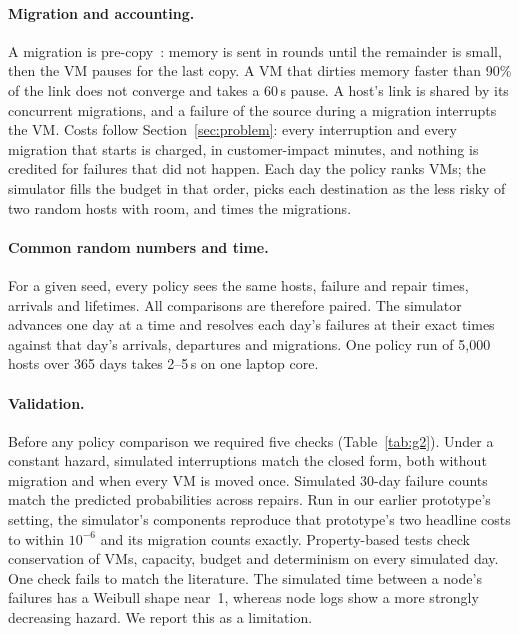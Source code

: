 \paragraph{Migration and accounting.}
A migration is pre-copy~\cite{clark2005live}: memory is sent in rounds until the remainder is
small, then the VM pauses for the last copy. A VM that dirties memory faster than 90\% of the
link does not converge and takes a 60\,s pause. A host's link is shared by its concurrent
migrations, and a failure of the source during a migration interrupts the VM. Costs follow
Section~\ref{sec:problem}: every interruption and every migration that starts is charged, in
customer-impact minutes, and nothing is credited for failures that did not happen. Each day the
policy ranks VMs; the simulator fills the budget in that order, picks each destination as the
less risky of two random hosts with room, and times the migrations.

\paragraph{Common random numbers and time.}
For a given seed, every policy sees the same hosts, failure and repair times, arrivals and
lifetimes. All comparisons are therefore paired. The simulator advances one day at a time and
resolves each day's failures at their exact times against that day's arrivals, departures and
migrations. One policy run of 5{,}000 hosts over 365 days takes 2--5\,s on one laptop core.

\paragraph{Validation.}
Before any policy comparison we required five checks (Table~\ref{tab:g2}). Under a constant
hazard, simulated interruptions match the closed form, both without migration and when every VM
is moved once. Simulated 30-day failure counts match the predicted probabilities across repairs.
Run in our earlier prototype's setting, the simulator's components reproduce that prototype's
two headline costs to within $10^{-6}$ and its migration counts exactly. Property-based tests
check conservation of VMs, capacity, budget and determinism on every simulated day. One check
fails to match the literature. The simulated time between a node's failures has a Weibull shape
near~1, whereas node logs show a more strongly decreasing hazard. We report this as a limitation.

